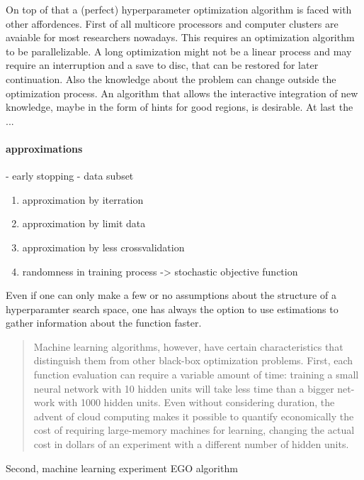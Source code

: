 \documentclass[english]{article}
\begin{document}
On top of that a (perfect) hyperparameter optimization algorithm is faced with other affordences. First of all multicore processors and computer clusters are avaiable for most researchers nowadays. This requires an optimization algorithm to be parallelizable. A long optimization might not be a linear process and may require an interruption and a save to disc, that can be restored for later continuation. Also the knowledge about the problem can change outside the optimization process. An algorithm that allows the interactive integration of new knowledge, maybe in the form of hints for good regions, is desirable.
At last the ...
\paragraph{approximations}
 - early stopping
 - data subset

\begin{enumerate}
  \item approximation by iterration
  \item approximation by limit data
  \item approximation by less crossvalidation
  \item randomness in training process -> stochastic objective function
\end{enumerate}

Even if one can only make a few or no assumptions about the structure of a hyperparamter search space, one has always the option to use estimations to gather information about the function faster.


\begin{quote}
Machine learning algorithms, however, have certain characteristics that distinguish them from other black-box optimization problems.  First, each function evaluation can require a variable amount of time:  training a small neural network with 10 hidden units will take less time than a bigger net-work with 1000 hidden units.  Even without considering duration, the advent of cloud computing makes it possible to quantify economically the cost of requiring large-memory machines for learning, changing the actual cost in dollars of an experiment with a different number of hidden units.
\end{quote}
Second, machine learning experiment EGO algorithm
\end{document}
